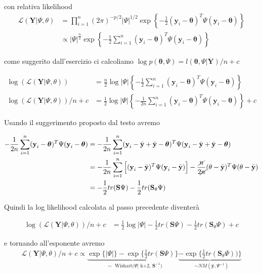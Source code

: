 con relativa likelihood
\begin{align*}
\mathcal{L}(\textbf{Y}|\Psi,\theta) &= \prod_{i=1}^n(2\pi)^{-p/2}|\Psi|^{1/2}\exp\left\{-\frac{1}{2}(\textbf{y}_i-\boldsymbol{\theta})^T\Psi(\textbf{y}_i-\boldsymbol{\theta})\right\}\\
&\propto |\Psi|^{\frac{n}{2}}\exp\left\{-\frac{1}{2}\sum_{i=1}^n(\textbf{y}_i-\boldsymbol{\theta})^T\Psi(\textbf{y}_i-\boldsymbol{\theta})\right\}
\end{align*}

come suggerito dall'esercizio ci calcoliamo $\log p(\boldsymbol{\theta},\Psi) = l(\boldsymbol{\theta},\Psi|\textbf{Y})/n+c$

\begin{align*}
\log(\mathcal{L}(\textbf{Y}|\Psi,\theta)) &=  \frac{n}{2}\log|\Psi|\left\{-\frac{1}{2}\sum_{i=1}^n(\textbf{y}_i-\boldsymbol{\theta})^T\Psi(\textbf{y}_i-\boldsymbol{\theta})\right\}\\
\log(\mathcal{L}(\textbf{Y}|\Psi,\theta))/n + c &=  \frac{1}{2}\log|\Psi|\left\{-\frac{1}{2n}\sum_{i=1}^n(\textbf{y}_i-\boldsymbol{\theta})^T\Psi(\textbf{y}_i-\boldsymbol{\theta})\right\} + c
\end{align*}

Usando il suggerimento proposto dal testo avremo

\begin{align*}
-\frac{1}{2n}\sum_{i=1}^n(\textbf{y}_i-\boldsymbol{\theta})^T\Psi(\textbf{y}_i-\boldsymbol{\theta}) &= -\frac{1}{2n}\sum_{i=1}^n(\textbf{y}_i - \bar{\textbf{y}}+\bar{\textbf{y}} - \boldsymbol{\theta})^T\Psi(\textbf{y}_i - \bar{\textbf{y}}+\bar{\textbf{y}} - \boldsymbol{\theta})\\
&=-\frac{1}{2n}\sum_{i=1}^n\Big[(\textbf{y}_i - \bar{\textbf{y}})^T\Psi(\textbf{y}_i - \bar{\textbf{y}})\Big] -\frac{\cancel{n}}{2\cancel{n}} (\theta - \bar{\textbf{y}})^T\Psi(\theta- \bar{\textbf{y}})\\
&=-\frac{1}{2}tr(\textbf{S}\Psi)-\frac{1}{2}tr(\textbf{S}_\theta\Psi)
\end{align*}

Quindi la log likelihood calcolata al passo precedente diventerà

\begin{align*}
\log(\mathcal{L}(\textbf{Y}|\Psi,\theta))/n + c &=  \frac{1}{2}\log|\Psi|-\frac{1}{2}tr(\textbf{S}\Psi)-\frac{1}{2}tr(\textbf{S}_\theta\Psi) + c
\end{align*}

e tornando all'esponente avremo
\begin{align*}
\mathcal{L}(\textbf{Y}|\Psi,\theta)/n + c \propto  \underbrace{\exp\{|\Psi|\}-\exp\Big\{\frac{1}{2}tr(\textbf{S}\Psi)\Big\}}_\text{ $\sim$  Wishart($\Psi|$ k+2, $\textbf{S}^{-1}$)}
\underbrace{-\exp\Big\{\frac{1}{2}tr(\textbf{S}_\theta\Psi))\Big\}}_\text{ $\sim NM(\bar{\textbf{y}},\Psi^{-1})$}
\end{align*}

